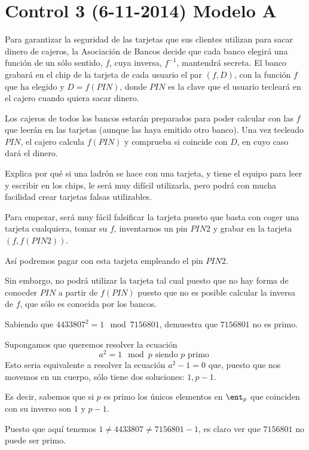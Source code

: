 \section{Control 3 (6-11-2014) Modelo A}
\begin{problem}[1]
Para garantizar la seguridad de las tarjetas que sus clientes utilizan para sacar dinero de cajeros, la Asociación de Bancos decide que cada banco elegirá una función de un sólo sentido, $f$, cuya inversa, $f^{-1}$, mantendrá secreta. El banco grabará en el chip de la tarjeta de cada usuario el par $(f,D)$, con la función $f$ que ha elegido y $D=f(PIN)$, donde $PIN$ es la clave que el usuario tecleará en el cajero cuando quiera sacar dinero.

Los cajeros de todos los bancos estarán preparados para poder calcular con las $f$ que leerán en las tarjetas (aunque las haya emitido otro banco). Una vez tecleado $PIN$, el cajero calcula $f(PIN)$ y comprueba si coincide con $D$, en cuyo caso dará el dinero.

Explica por qué si una ladrón se hace con una tarjeta, y tiene el equipo para leer y escribir en los chips, le será muy difícil utilizarla, pero podrá con mucha facilidad crear tarjetas falsas utilizables.
\solution
{}

Para empezar, será muy fácil falsificar la tarjeta puesto que basta con coger una tarjeta cualquiera, tomar su $f$, inventarnos un pin $PIN2$ y grabar en la tarjeta $(f,f(PIN2))$.

Así podremos pagar con esta tarjeta empleando el pin $PIN2$.

Sin embargo, no podrá utilizar la tarjeta tal cual puesto que no hay forma de conocder $PIN$ a partir de $f(PIN)$ puesto que no es posible calcular la inversa de $f$, que sólo es conocida por los bancos.

\end{problem}

\begin{problem}[2]
Sabiendo que $4433807^2 = 1 \mod 7156801$, demuestra que $7156801$ no es primo.
\solution


Supongamos que queremos resolver la ecuación
\[a^2=1 \mod p \text{ siendo } p \text{ primo }\]
Esto seria equivalente a resolver la ecuación $a^2-1=0$ que, puesto que nos movemos en un cuerpo, sólo tiene dos soluciones: $1, p-1$.

Es decir, sabemos que si $p$ es primo los únicos elementos en $\ent_p$ que coinciden con su inverso son $1$ y $p-1$.

Puesto que aquí tenemos $1 \neq 4433807 \neq 7156801-1$, es claro ver que $7156801$ no puede ser primo.

\end{problem}

